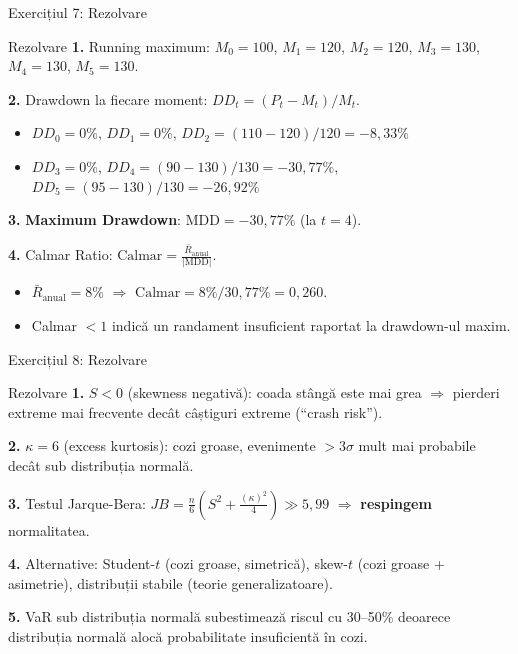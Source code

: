 \documentclass[9pt, aspectratio=169, t]{beamer}
\theoremstyle{definition}
\begin{document}
\begin{frame}{Exercițiul 7: Rezolvare}
\begin{block}{Rezolvare}
\textbf{1.} Running maximum: $M_0 = 100$, $M_1 = 120$, $M_2 = 120$, $M_3 = 130$, $M_4 = 130$, $M_5 = 130$.

\textbf{2.} Drawdown la fiecare moment: $DD_t = (P_t - M_t)/M_t$.
\begin{itemize}
\item $DD_0 = 0\%$, $DD_1 = 0\%$, $DD_2 = (110-120)/120 = -8{,}33\%$
\item $DD_3 = 0\%$, $DD_4 = (90-130)/130 = -30{,}77\%$, $DD_5 = (95-130)/130 = -26{,}92\%$
\end{itemize}

\textbf{3.} \textbf{Maximum Drawdown}: $\text{MDD} = -30{,}77\%$ (la $t = 4$).

\textbf{4.} Calmar Ratio: $\text{Calmar} = \frac{\bar{R}_{\text{anual}}}{|\text{MDD}|}$.
\begin{itemize}
\item $\bar{R}_{\text{anual}} = 8\%$ $\Rightarrow$ $\text{Calmar} = 8\%/30{,}77\% = 0{,}260$.
\item Calmar $< 1$ indică un randament insuficient raportat la drawdown-ul maxim.
\end{itemize}
\end{block}
\end{frame}

\begin{frame}{Exercițiul 8: Rezolvare}
\begin{block}{Rezolvare}
\textbf{1.} $S < 0$ (skewness negativă): coada stângă este mai grea $\Rightarrow$ pierderi extreme mai frecvente decât câștiguri extreme (``crash risk'').

\textbf{2.} $\kappa = 6$ (excess kurtosis): cozi groase, evenimente $> 3\sigma$ mult mai probabile decât sub distribuția normală.

\textbf{3.} Testul Jarque-Bera: $JB = \frac{n}{6}\left(S^2 + \frac{(\kappa)^2}{4}\right) \gg 5{,}99$ $\Rightarrow$ \textbf{respingem} normalitatea.

\textbf{4.} Alternative: Student-$t$ (cozi groase, simetrică), skew-$t$ (cozi groase + asimetrie), distribuții stabile (teorie generalizatoare).

\textbf{5.} VaR sub distribuția normală subestimează riscul cu 30--50\% deoarece distribuția normală alocă probabilitate insuficientă în cozi.
\end{block}
\end{frame}
\end{document}
